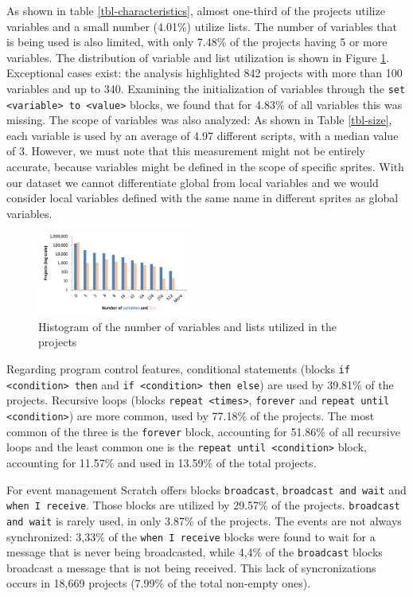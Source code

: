 \documentclass{sig-alternate}
\begin{document}
As shown in table \ref{tbl-characteristics}, almost one-third of the projects utilize variables and a small number (4.01\%) utilize lists. The number of variables that is being used is also limited, with only 7.48\% of the projects having 5 or more variables. The distribution of variable and list utilization is shown in Figure \ref{fig:variables}. Exceptional cases exist: the analysis highlighted 842 projects with more than 100 variables and up to 340. Examining the initialization of variables through the \texttt{set <variable> to <value>} blocks, we found that for 4.83\% of all variables this was missing. The scope of variables was also analyzed: As shown in Table \ref{tbl-size}, each variable is used by an average of 4.97 different scripts, with a median value of 3. However, we must note that this measurement might not be entirely accurate, because variables might be defined in the scope of specific sprites. With our dataset we cannot differentiate global from local variables and we would consider local variables defined with the same name in different sprites as global variables.

\begin{figure}
	\centering
	\includegraphics[width=0.45\textwidth]{fig/charts/8variableslists}
	\caption{Histogram of the number of variables and lists utilized in the projects}
	\label{fig:variables}
\end{figure}

Regarding program control features, conditional statements (blocks \texttt{if <condition> then} and \texttt{if <condition> then else}) are used by 39.81\% of the projects. Recursive loops (blocks \texttt{repeat <times>}, \texttt{forever} and \texttt{repeat until <condition>}) are more common, used by 77.18\% of the projects. The most common of the three is the \texttt{forever} block, accounting for 51.86\% of all recursive loops and the least common one is the \texttt{repeat until <condition>} block, accounting for 11.57\% and used in 13.59\% of the total projects.
	
For event management Scratch offers blocks \texttt{broadcast}, \texttt{broadcast and wait} and \texttt{when I receive}. 
Those blocks are utilized by 29.57\% of the projects. \texttt{broadcast and wait} is rarely used, in only 3.87\% of the projects. The events are not always synchronized: 3,33\% of the \texttt{when I receive} blocks were found to wait for a message that is never being broadcasted, while 4,4\% of the \texttt{broadcast} blocks broadcast a message that is not being received. This lack of syncronizations occurs in 18,669 projects (7.99\% of the total non-empty ones).
\end{document}
